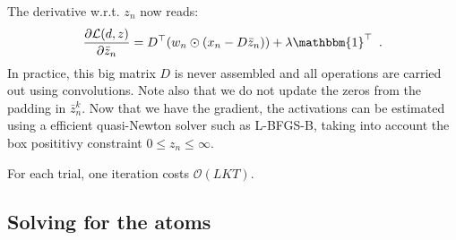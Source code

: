 The derivative w.r.t. $z_n$ now reads:
\begin{equation}
\frac{\partial \mathcal{L}(d, z)}{\partial \bar{z}_n}
= D^\top(w_n \odot (x_n - D\bar{z}_n)) + \lambda \mathbbm{1}^\top \enspace .
\end{equation}
In practice, this big matrix $D$ is never assembled and all operations are carried out using convolutions. Note also that we do not update the zeros from the padding in $\bar{z}_n^k$. Now that we have the gradient, the activations can be estimated using a efficient quasi-Newton solver such as L-BFGS-B, taking into account the box posititivy constraint $0 \leq z_n \leq \infty$.

For each trial, one iteration costs $\mathcal{O}(LKT)$.

\subsection{Solving for the atoms}

